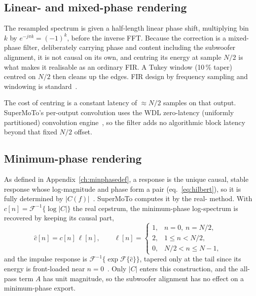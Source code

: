 \subsection{Linear- and mixed-phase rendering}
The resampled spectrum is given a half-length linear phase shift, multiplying bin $k$ by $e^{-j\pi k}=(-1)^k$, before the inverse FFT. Because the correction is a mixed-phase filter, deliberately carrying phase and  content including the subwoofer alignment, it is not causal on its own, and centring its energy at sample $N/2$ is what makes it realisable as an ordinary FIR. A Tukey window (10\,\% taper) centred on $N/2$ then cleans up the edges. FIR design by frequency sampling and windowing is standard~\cite{OppenheimSchafer}.

The cost of centring is a constant latency of $\approx N/2$ samples on that output. SuperMoTo's per-output convolution uses the WDL zero-latency (uniformly partitioned) convolution engine~\cite{Gardner1995}, so the filter adds no algorithmic block latency beyond that fixed $N/2$ offset.

\subsection{Minimum-phase rendering}\label{sec:minphase}
As defined in Appendix~\ref{ch:minphasedef}, a  response is the unique causal, stable response whose log-magnitude and phase form a  pair (eq.~\eqref{eq:hilbert}), so it is fully determined by $|C(f)|$~\cite{OppenheimSchafer}. SuperMoTo computes it by the real- method. With $c[n]=\mathcal{F}^{-1}\{\log|C|\}$ the real cepstrum, the minimum-phase log-spectrum is recovered by keeping its causal part,
\begin{equation}
  \hat c[n] = c[n]\,\ell[n], \qquad
  \ell[n] = \begin{cases}
              1, & n=0,\ n=N/2,\\
              2, & 1\le n < N/2,\\
              0, & N/2 < n \le N-1,
            \end{cases}
\end{equation}
and the impulse response is $\mathcal{F}^{-1}\bigl\{\exp \mathcal{F}\{\hat c\}\bigr\}$, tapered only at the tail since its energy is front-loaded near $n=0$~\cite{OppenheimSchafer}. Only $|C|$ enters this construction, and the all-pass term $A$ has unit magnitude, so the subwoofer alignment has no effect on a minimum-phase export.
